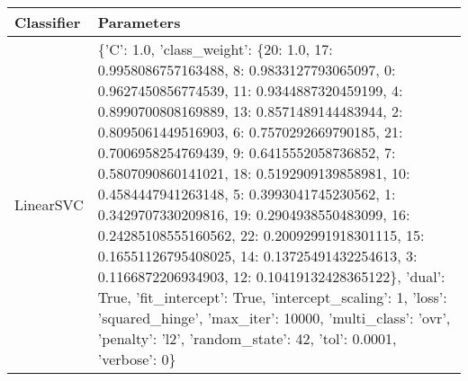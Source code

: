 \begin{tabular}{p{3cm}|p{10cm}}
\toprule
Classifier &                                                                                                                                                                                                                                                                                                                                                                                                                                                                                                                                                                                                                                                                                                                                                                        Parameters \\
\midrule
 LinearSVC & \{'C': 1.0, 'class\_weight': \{20: 1.0, 17: 0.9958086757163488, 8: 0.9833127793065097, 0: 0.9627450856774539, 11: 0.9344887320459199, 4: 0.8990700808169889, 13: 0.8571489144483944, 2: 0.8095061449516903, 6: 0.7570292669790185, 21: 0.7006958254769439, 9: 0.6415552058736852, 7: 0.5807090860141021, 18: 0.5192909139858981, 10: 0.4584447941263148, 5: 0.3993041745230562, 1: 0.3429707330209816, 19: 0.2904938550483099, 16: 0.24285108555160562, 22: 0.20092991918301115, 15: 0.16551126795408025, 14: 0.13725491432254613, 3: 0.1166872206934903, 12: 0.10419132428365122\}, 'dual': True, 'fit\_intercept': True, 'intercept\_scaling': 1, 'loss': 'squared\_hinge', 'max\_iter': 10000, 'multi\_class': 'ovr', 'penalty': 'l2', 'random\_state': 42, 'tol': 0.0001, 'verbose': 0\} \\
\bottomrule
\end{tabular}
